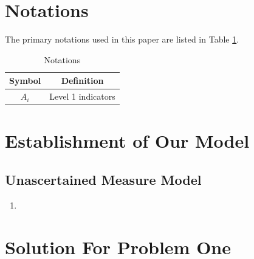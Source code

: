 \documentclass[12pt]{article}  %
\begin{document}
\section{Notations}
The primary notations used in this paper are listed in Table \ref{tb:notation}.

\begin{table}[!htbp]
\begin{center}
\caption{Notations}
\begin{tabular}{cc}
	\toprule
	\multicolumn{1}{m{3cm}}{\centering Symbol}
	&\multicolumn{1}{m{8cm}}{\centering Definition}\\
	\midrule
	$A_i$&Level 1 indicators\\
	\bottomrule
\end{tabular}\label{tb:notation}
\end{center}
\end{table}













\section{Establishment of Our Model}
\subsection{Unascertained Measure Model}

\begin{enumerate}
    \renewcommand{\labelenumi}{\textbf{Step \theenumi}}
    \item 

\end{enumerate}
































\section{Solution For Problem One}
\end{document}
